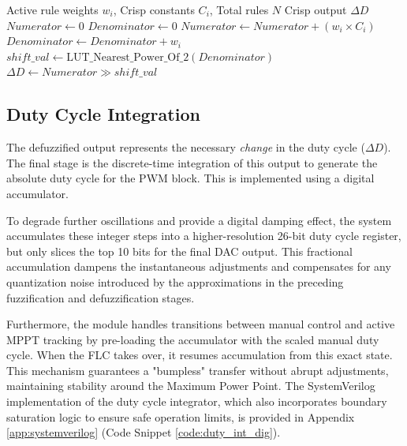 \documentclass[a4paper,oneside,12pt]{report}
\numberwithin{equation}{chapter}
\begin{document}
\begin{algorithm}[H]
\caption{Hardware-Efficient Sugeno Defuzzification}
\label{alg:defuzzification}
\begin{algorithmic}[1]
\REQUIRE Active rule weights $w_i$, Crisp constants $C_i$, Total rules $N$
\ENSURE Crisp output $\Delta D$
\STATE $Numerator \leftarrow 0$
\STATE $Denominator \leftarrow 0$
    \STATE $Numerator \leftarrow Numerator + (w_i \times C_i)$
    \STATE $Denominator \leftarrow Denominator + w_i$
\ENDFOR
\STATE $shift\_val \leftarrow \text{LUT\_Nearest\_Power\_Of\_2}(Denominator)$
\STATE $\Delta D \leftarrow Numerator \gg shift\_val$
\end{algorithmic}
\end{algorithm}

\subsection{Duty Cycle Integration}
The defuzzified output represents the necessary \textit{change} in the duty cycle ($\Delta D$). The final stage is the discrete-time integration of this output to generate the absolute duty cycle for the PWM block. This is implemented using a digital accumulator.

To degrade further oscillations and provide a digital damping effect, the system accumulates these integer steps into a higher-resolution 26-bit duty cycle register, but only slices the top 10 bits for the final DAC output. This fractional accumulation dampens the instantaneous adjustments and compensates for any quantization noise introduced by the approximations in the preceding fuzzification and defuzzification stages. 

Furthermore, the module handles transitions between manual control and active MPPT tracking by pre-loading the accumulator with the scaled manual duty cycle. When the FLC takes over, it resumes accumulation from this exact state. This mechanism guarantees a "bumpless" transfer without abrupt adjustments, maintaining stability around the Maximum Power Point. The SystemVerilog implementation of the duty cycle integrator, which also incorporates boundary saturation logic to ensure safe operation limits, is provided in Appendix \ref{app:systemverilog} (Code Snippet \ref{code:duty_int_dig}).
\end{document}
